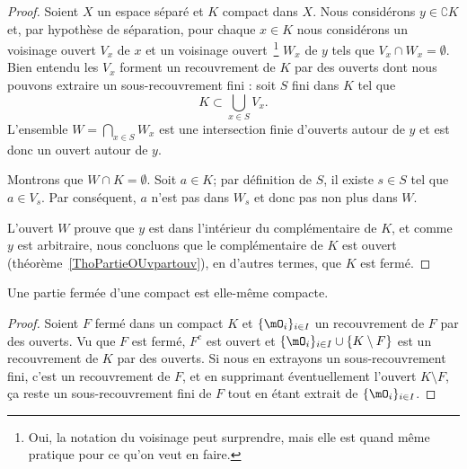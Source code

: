 \begin{proof}
    Soient \( X\) un espace séparé et \( K\) compact dans \( X\). Nous considérons \( y \in\complement K\) et, par hypothèse de séparation, pour chaque \( x\in K\) nous considérons un voisinage ouvert \( V_x\) de \( x\) et un voisinage ouvert~\footnote{Oui, la notation du voisinage peut surprendre, mais elle est quand même pratique pour ce qu'on veut en faire.} \( W_x\) de \( y\) tels que \( V_x\cap W_x=\emptyset\). Bien entendu les \( V_x\) forment un recouvrement de \( K\) par des ouverts dont nous pouvons extraire un sous-recouvrement fini : soit \( S\) fini dans \( K\) tel que
    \begin{equation}
        K\subset\bigcup_{x\in S}V_x.
    \end{equation}
    L'ensemble \( W=\bigcap_{x\in S}W_x\) est une intersection finie d'ouverts autour de \( y\) et est donc un ouvert autour de \( y\). 
    
    Montrons que \( W\cap K=\emptyset\). Soit \( a\in K\); par définition de \( S\), il existe \( s\in S\) tel que \( a\in V_s\). Par conséquent, \( a\) n'est pas dans \( W_s\) et donc pas non plus dans \( W\).
    

    L'ouvert \( W\) prouve que \( y\) est dans l'intérieur du complémentaire de \( K\), et comme \( y \) est arbitraire, nous concluons que le complémentaire de \( K\) est ouvert (théorème~\ref{ThoPartieOUvpartouv}), en d'autres termes, que \( K\) est fermé.
\end{proof}

\begin{lemma}   \label{LemnAeACf}
    Une partie fermée d'une compact est elle-même compacte.
\end{lemma}

\begin{proof}

    Soient \( F\) fermé dans un compact \( K\) et \( \{ \mO_i \}_{i\in I}\) un recouvrement de \( F\) par des ouverts. Vu que \( F\) est fermé, \( F^c\) est ouvert et \( \{ \mO_i \}_{i\in I}\cup\{ K\setminus F \}\) est un recouvrement de \( K\) par des ouverts. Si nous en extrayons un sous-recouvrement fini, c'est un recouvrement de \( F\), et en supprimant éventuellement l'ouvert \( K\setminus F\), ça reste un sous-recouvrement fini de \( F\) tout en étant extrait de \( \{ \mO_i \}_{i\in I}\).
\end{proof}

